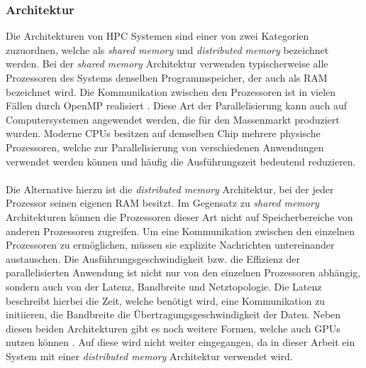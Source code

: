 \subsubsection{Architektur}
\label{subsubsec:hpc_architecture}
Die Architekturen von \ac{HPC} Systemen sind einer von zwei Kategorien zuzuordnen, welche als \emph{shared memory} und \emph{distributed memory} bezeichnet werden. Bei der \emph{shared memory} Architektur verwenden typischerweise alle Prozessoren des Systems denselben Programmspeicher, der auch als \ac{RAM} bezeichnet wird. Die Kommunikation zwischen den Prozessoren ist in vielen Fällen durch \ac{OpenMP} realisiert \cite{nielsen2016introduction}. Diese Art der Parallelisierung kann auch auf Computersystemen angewendet werden, die für den Massenmarkt produziert wurden. Moderne \acp{CPU} besitzen auf demselben Chip mehrere physische Prozessoren, welche zur Parallelisierung von verschiedenen Anwendungen verwendet werden können und häufig die Ausführungszeit bedeutend reduzieren. 
\\\\
Die Alternative hierzu ist die \emph{distributed memory} Architektur, bei der jeder Prozessor seinen eigenen \ac{RAM} besitzt. Im Gegensatz zu \emph{shared memory} Architekturen können die Prozessoren dieser Art nicht auf Speicherbereiche von anderen Prozessoren zugreifen. Um eine Kommunikation zwischen den einzelnen Prozessoren zu ermöglichen, müssen sie explizite Nachrichten untereinander austauschen. Die Ausführungsgeschwindigkeit bzw. die Effizienz der parallelisierten Anwendung ist nicht nur von den einzelnen Prozessoren abhängig, sondern auch von der Latenz, Bandbreite und Netztopologie. Die Latenz beschreibt hierbei die Zeit, welche benötigt wird, eine Kommunikation zu initiieren, die Bandbreite die Übertragungsgeschwindigkeit der Daten. Neben diesen beiden Architekturen gibt es noch weitere Formen, welche auch \acp{GPU} nutzen können \cite{nielsen2016introduction}. Auf diese wird nicht weiter eingegangen, da in dieser Arbeit ein System mit einer \emph{distributed memory} Architektur verwendet wird.

